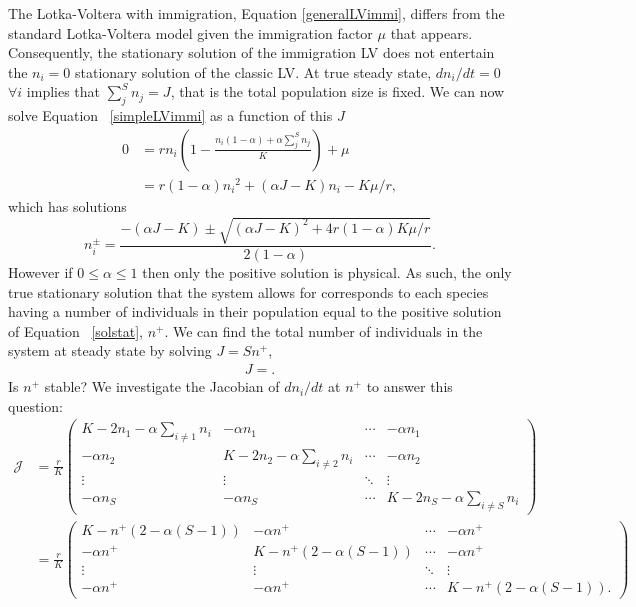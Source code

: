 \documentclass[11pt,a4paper,final]{iopart}
\begin{document}
The Lotka-Voltera with immigration, Equation \ref{generalLVimmi}, differs from the standard Lotka-Voltera model given the immigration factor $\mu$ that appears.
Consequently, the stationary solution of the immigration LV does not entertain the $n_i=0$ stationary solution of the classic LV.
At true steady state, $dn_i/dt=0$ $\forall i$ implies that $\sum_j^S n_j=J$, that is the total population size is fixed.
We can now solve Equation ~\ref{simpleLVimmi} as a function of this $J$
\begin{align*}
0 &= r n_i\left( 1 - \frac{n_i(1-\alpha) + \alpha \sum_{j}^S n_j}{K} \right) + \mu \\
&= r( 1 - \alpha ){n_i}^2 + (\alpha J -K)n_i - K \mu / r,
\end{align*} 
which has solutions
\begin{equation}\label{solstat}
n_i^\pm = \frac{-(\alpha J - K) \pm \sqrt{(\alpha J - K)^2 + 4r(1-\alpha)K \mu / r }}{2(1-\alpha )}.
\end{equation}
However if $0\leq \alpha \leq 1$ then only the positive solution is physical.
As such, the only true stationary solution that the system allows for corresponds to each species having a number of individuals in their population equal to the positive solution of Equation ~\ref{solstat}, $n^+$.
We can find the total number of individuals in the system at steady state by solving $J=S n^+$,
\begin{align*}
J = .
\end{align*}
Is $n^+$ stable? We investigate the Jacobian of $dn_i/dt$ at $n^+$ to answer this question:
\begin{align*}
\mathcal{J} &= \frac{r}{K} \begin{pmatrix}
K - 2 n_1 - \alpha \sum_{i\neq 1} n_i & - \alpha n_1 & \cdots & -\alpha n_1 \\
- \alpha n_2 & K - 2 n_2 - \alpha \sum_{i\neq 2} n_i & \cdots & - \alpha n_2 \\
\vdots & \vdots & \ddots & \vdots \\
- \alpha n_S & - \alpha n_S & \cdots & K - 2 n_S - \alpha \sum_{i\neq S} n_i
\end{pmatrix} \\
&= \frac{r}{K} \begin{pmatrix}
K - n^+ (2 - \alpha (S-1)) & - \alpha n^+ & \cdots & -\alpha n^+ \\
- \alpha n^+ & K - n^+ (2 - \alpha (S-1)) & \cdots & - \alpha n^+ \\
\vdots & \vdots & \ddots & \vdots \\
- \alpha n^+ & - \alpha n^+ & \cdots & K - n^+ (2 - \alpha (S-1)).
\end{pmatrix} 
\end{align*}
\end{document}
